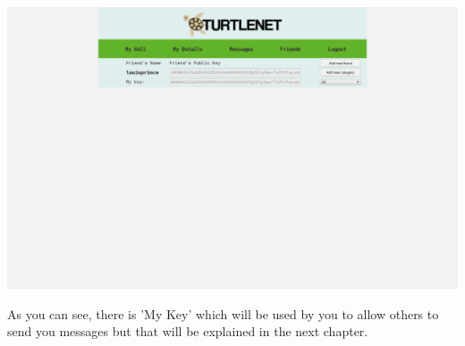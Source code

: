 \includegraphics[scale=0.2]{../Screenshots/Screenshot from 2014-04-29 22-31-10}

As you can see, there is 'My Key' which will be used by you to allow others to
send you messages but that will be explained in the next chapter.  

